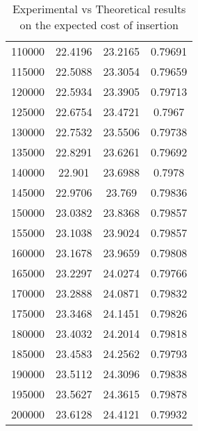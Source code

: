 \begin{table}
\begin{minipage}{0.48\textwidth}
\begin{tabular}{|c|c|c|c|}
            110000 & 22.4196 & 23.2165 & 0.79691 \\ 
            115000 & 22.5088 & 23.3054 & 0.79659 \\ 
            120000 & 22.5934 & 23.3905 & 0.79713 \\ 
            125000 & 22.6754 & 23.4721 & 0.7967 \\ 
            130000 & 22.7532 & 23.5506 & 0.79738 \\ 
            135000 & 22.8291 & 23.6261 & 0.79692 \\ 
            140000 & 22.901 & 23.6988 & 0.7978 \\ 
            145000 & 22.9706 & 23.769 & 0.79836 \\ 
            150000 & 23.0382 & 23.8368 & 0.79857 \\ 
            155000 & 23.1038 & 23.9024 & 0.79857 \\ 
            160000 & 23.1678 & 23.9659 & 0.79808 \\ 
            165000 & 23.2297 & 24.0274 & 0.79766 \\ 
            170000 & 23.2888 & 24.0871 & 0.79832 \\ 
            175000 & 23.3468 & 24.1451 & 0.79826 \\ 
            180000 & 23.4032 & 24.2014 & 0.79818 \\ 
            185000 & 23.4583 & 24.2562 & 0.79793 \\ 
            190000 & 23.5112 & 24.3096 & 0.79838 \\ 
            195000 & 23.5627 & 24.3615 & 0.79878 \\ 
            200000 & 23.6128 & 24.4121 & 0.79932 \\ 
            \hline 
        \end{tabular}
    \end{minipage}
    \caption{Experimental vs Theoretical results on the expected cost of insertion}
    \label{tab:tabIns}
\end{table}
